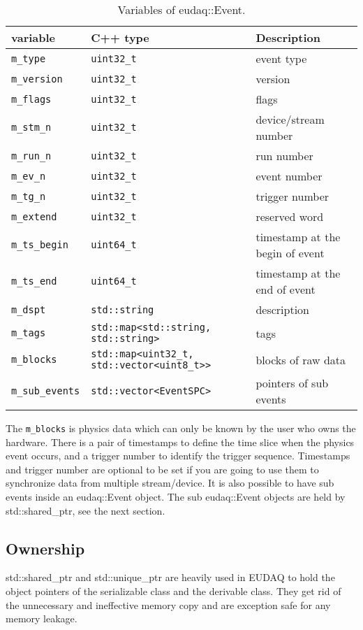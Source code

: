\begin{table}
\centering
\small
\begin{tabular}{ l | l | l }
  \textbf{variable} & \textbf{C++ type} & \textbf{Description}\\
  \hline
  \texttt{m\_type} & \texttt{uint32\_t} & event type\\
  \texttt{m\_version} & \texttt{uint32\_t} & version\\
  \texttt{m\_flags} & \texttt{uint32\_t} & flags\\
  \texttt{m\_stm\_n} & \texttt{uint32\_t} & device/stream number\\
  \texttt{m\_run\_n} & \texttt{uint32\_t} & run number\\
  \texttt{m\_ev\_n} & \texttt{uint32\_t} & event number\\
  \texttt{m\_tg\_n} & \texttt{uint32\_t} & trigger number\\
  \texttt{m\_extend} & \texttt{uint32\_t} & reserved word\\
  \texttt{m\_ts\_begin} & \texttt{uint64\_t} & timestamp at the begin of event\\
  \texttt{m\_ts\_end} & \texttt{uint64\_t} & timestamp at the end of event\\
  \texttt{m\_dspt} & \texttt{std::string} & description\\
  \texttt{m\_tags} & \texttt{std::map<std::string, std::string>} & tags\\
  \texttt{m\_blocks} & \texttt{std::map<uint32\_t, std::vector<uint8\_t>>} & blocks of raw data\\
  \texttt{m\_sub\_events} & \texttt{std::vector<EventSPC>} & pointers of sub events\\
\end{tabular}
\caption{Variables of eudaq::Event.}
\label{tab:eventdata}
\end{table}

The \texttt{m\_blocks} is physics data which can only be known by the user who owns the hardware. There is a pair of timestamps to define the time slice when the physics event occurs, and a trigger number to identify the trigger sequence. Timestamps and trigger number are optional to be set if you are going to use them to synchronize data from multiple stream/device. It is also possible to have sub events inside an eudaq::Event object. The sub eudaq::Event objects are held by std::shared\_ptr, see the next section.

\subsection{Ownership}
std::shared\_ptr and std::unique\_ptr are heavily used in EUDAQ to hold the object pointers of the serializable class and the derivable class.  They get rid of the unnecessary and ineffective memory copy and are exception safe for any memory leakage.

